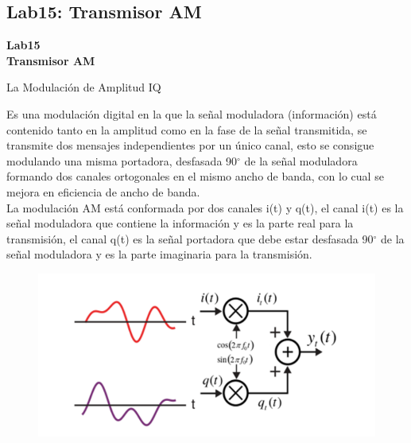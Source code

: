 \subsection{Lab15: Transmisor AM}

\begin{frame}{}


\bfseries{\textrm{\LARGE Lab15\\ \Large Transmisor AM}}
\raggedright
\end{frame}

\begin{frame}{La Modulación de Amplitud IQ}


Es una modulación digital en la que la señal moduladora (información) está contenido tanto en la amplitud como en la fase de la señal transmitida, se transmite dos mensajes independientes por un único canal, esto se consigue modulando una misma portadora, desfasada 90$^{\circ}$ de la señal moduladora formando dos canales ortogonales en el mismo ancho de banda, con lo cual se mejora en eficiencia de ancho de banda.\\
\vspace{2mm}
La modulación AM está conformada por dos canales i(t) y q(t), el canal i(t) es la señal moduladora que contiene la información y es la parte real para la transmisión, el canal q(t) es la señal portadora que debe estar desfasada 90$^{\circ}$ de la señal moduladora y es la parte imaginaria para la transmisión.

\begin{figure}[H]
\vspace{-3mm}
\includegraphics[width=.5\textwidth]{parte3/lab15/pdf/lab15_1.pdf}
\end{figure}

\end{frame}

